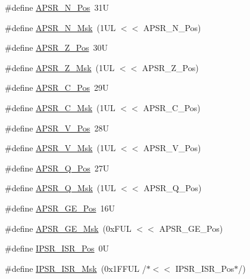 \begin{DoxyCompactItemize}
\item 
\#define \hyperlink{group___c_m_s_i_s___c_o_r_e_gac469528d210043c7bd3f12f0e6824766}{A\+P\+S\+R\+\_\+\+N\+\_\+\+Pos}~31U
\item 
\#define \hyperlink{group___c_m_s_i_s___c_o_r_e_gadbc2cf55a026f661b53fadfcf822cef1}{A\+P\+S\+R\+\_\+\+N\+\_\+\+Msk}~(1\+U\+L $<$$<$ A\+P\+S\+R\+\_\+\+N\+\_\+\+Pos)
\item 
\#define \hyperlink{group___c_m_s_i_s___c_o_r_e_ga3661286d108b1aca308d7445685eae3a}{A\+P\+S\+R\+\_\+\+Z\+\_\+\+Pos}~30U
\item 
\#define \hyperlink{group___c_m_s_i_s___c_o_r_e_ga1deb4d1aa72bb83d1f79329406f15711}{A\+P\+S\+R\+\_\+\+Z\+\_\+\+Msk}~(1\+U\+L $<$$<$ A\+P\+S\+R\+\_\+\+Z\+\_\+\+Pos)
\item 
\#define \hyperlink{group___c_m_s_i_s___c_o_r_e_ga6cf72aa6f09a168f9e5beda1a4a887b9}{A\+P\+S\+R\+\_\+\+C\+\_\+\+Pos}~29U
\item 
\#define \hyperlink{group___c_m_s_i_s___c_o_r_e_ga6d47803fbad455bc10bd1ce59f2f335d}{A\+P\+S\+R\+\_\+\+C\+\_\+\+Msk}~(1\+U\+L $<$$<$ A\+P\+S\+R\+\_\+\+C\+\_\+\+Pos)
\item 
\#define \hyperlink{group___c_m_s_i_s___c_o_r_e_gac62830f67679ccd11658c4172c3e6ea7}{A\+P\+S\+R\+\_\+\+V\+\_\+\+Pos}~28U
\item 
\#define \hyperlink{group___c_m_s_i_s___c_o_r_e_ga33305d6701356bff6890b315fe8b5489}{A\+P\+S\+R\+\_\+\+V\+\_\+\+Msk}~(1\+U\+L $<$$<$ A\+P\+S\+R\+\_\+\+V\+\_\+\+Pos)
\item 
\#define \hyperlink{group___c_m_s_i_s___c_o_r_e_ga298749e176f12827328bb7b92a6b2411}{A\+P\+S\+R\+\_\+\+Q\+\_\+\+Pos}~27U
\item 
\#define \hyperlink{group___c_m_s_i_s___c_o_r_e_ga90ffd4ec4149c2f5dd7747c1533fb002}{A\+P\+S\+R\+\_\+\+Q\+\_\+\+Msk}~(1\+U\+L $<$$<$ A\+P\+S\+R\+\_\+\+Q\+\_\+\+Pos)
\item 
\#define \hyperlink{group___c_m_s_i_s___c_o_r_e_ga722cb42b5c75af3e8909fac6fd40dfdc}{A\+P\+S\+R\+\_\+\+G\+E\+\_\+\+Pos}~16U
\item 
\#define \hyperlink{group___c_m_s_i_s___c_o_r_e_ga8a3ecbc0ea2029462b0f4ce50e227db1}{A\+P\+S\+R\+\_\+\+G\+E\+\_\+\+Msk}~(0x\+F\+U\+L $<$$<$ A\+P\+S\+R\+\_\+\+G\+E\+\_\+\+Pos)
\item 
\#define \hyperlink{group___c_m_s_i_s___c_o_r_e_ga0e34027584d02c43811ae908a5ca9adf}{I\+P\+S\+R\+\_\+\+I\+S\+R\+\_\+\+Pos}~0U
\item 
\#define \hyperlink{group___c_m_s_i_s___c_o_r_e_gaf013a4579a64d1f21f56ea9f1b33ab56}{I\+P\+S\+R\+\_\+\+I\+S\+R\+\_\+\+Msk}~(0x1\+F\+F\+U\+L /$\ast$$<$$<$ I\+P\+S\+R\+\_\+\+I\+S\+R\+\_\+\+Pos$\ast$/)

\end{DoxyCompactItemize}

